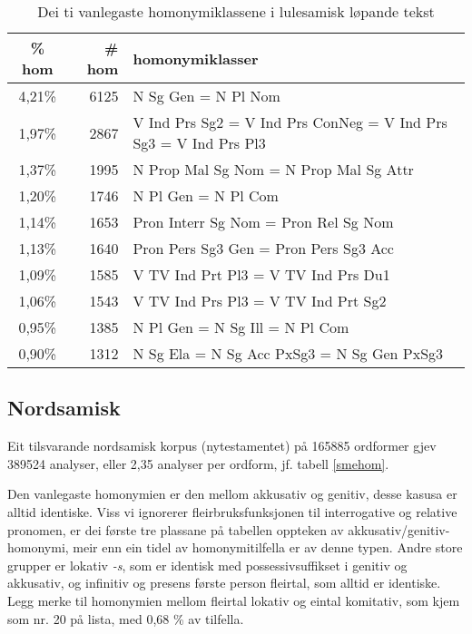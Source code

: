 \documentclass[a4paper,nynorsk]{article}
\begin{document}
\begin{table}[htdp]
\caption{Dei ti vanlegaste homonymiklassene i lulesamisk løpande tekst}
\begin{center}
\begin{tabular}{|c|r|l|}
\hline
\% hom & # hom & homonymiklasser \\
\hline
4,21\% & 6125 & N Sg Gen  =  N Pl Nom  \\
1,97\% & 2867 & V Ind Prs Sg2  =  V Ind Prs ConNeg  =  V Ind Prs Sg3  =  V Ind Prs Pl3  \\
1,37\% & 1995 & N Prop Mal Sg Nom  =  N Prop Mal Sg Attr  \\
1,20\% & 1746 & N Pl Gen  =  N Pl Com  \\
1,14\% & 1653 & Pron Interr Sg Nom  =  Pron Rel Sg Nom  \\
1,13\% & 1640 & Pron Pers Sg3 Gen  =  Pron Pers Sg3 Acc  \\
1,09\% & 1585 & V TV Ind Prt Pl3  =  V TV Ind Prs Du1  \\
1,06\% & 1543 & V TV Ind Prs Pl3  =  V TV Ind Prt Sg2  \\
0,95\% & 1385 & N Pl Gen  =  N Sg Ill  =  N Pl Com  \\
0,90\% & 1312 & N Sg Ela  =  N Sg Acc PxSg3  =  N Sg Gen PxSg3  \\
\hline
\end{tabular}
\end{center}
\label{smjhom}
\end{table}%

\subsection{Nordsamisk}

Eit tilsvarande nordsamisk korpus (nytestamentet) på 165885 ordformer gjev 389524 analyser, eller 2,35 analyser per ordform, jf. tabell \ref{smehom}.%

Den vanlegaste homonymien er den mellom akkusativ og genitiv, desse kasusa er alltid identiske. Viss vi ignorerer fleirbruksfunksjonen til interrogative og relative pronomen, er dei første tre plassane på tabellen oppteken av akkusativ/genitiv-homonymi, meir enn ein tidel av homonymitilfella er av denne typen. Andre store grupper er lokativ \emph{-s}, som er identisk med possessivsuffikset i genitiv og akkusativ, og infinitiv og presens første person fleirtal, som alltid er identiske. Legg merke til homonymien mellom fleirtal lokativ og eintal komitativ, som kjem som nr. 20 på lista, med 0,68 \% av tilfella.%
\end{document}
